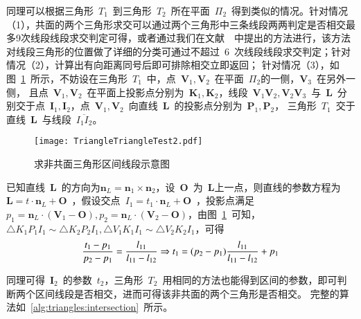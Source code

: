 同理可以根据三角形~$T_1$~到三角形~$T_2$~所在平面~$\Pi_2$~得到类似的情况。针对情况（1），共面的两个三角形求交可以通过两个三角形中三条线段两两判定是否相交最多9次线段线段求交判定可得，或者通过我们在文献~~中提出的方法进行，该方法对线段三角形的位置做了详细的分类可通过不超过~6~次线段线段求交判定；针对情况（2），计算出有向距离同号后即可排除相交立即返回；
针对情况（3），如图~\ref{fig:two:triangle:ui2}~所示，不妨设在三角形~$T_1$~中，点~$\bm{V}_1, \bm{V}_2$~在平面~$\Pi_2$的一侧，$\bm{V}_3$~在另外一侧，
且点~$\bm{V}_1, \bm{V}_2$~在平面上投影点分别为~$\bm{K}_1,\bm{K}_2$，线段~$\bm{V}_1\bm{V}_2, \bm{V}_2\bm{V}_3$~与~$\bm{L}$~分别交于点~$\bm{I}_1,\bm{I}_2$，点~$\bm{V}_1,\bm{V}_2$~向直线~$\bm{L}$~的投影点分别为~$\bm{P}_1,\bm{P}_2$，
三角形~$T_1$~交于直线~$\bm{L}$~与线段~$\overline{I_1I_2}$。%

\begin{figure}[H]
  \centering
    \texttt{[image: TriangleTriangleTest2.pdf]}
    \caption{求非共面三角形区间线段示意图\cite{Moller1997}}
  \label{fig:two:triangle:ui2}
\end{figure}

已知直线~$\bm{L}$~的方向为$\bm{n}_L = \bm{n}_1 \times \bm{n}_2$，设~$\bm{O}$~为~$\bm{L}$上一点，则直线的参数方程为
$\bm{L} = t \cdot \bm{n}_L + \bm{O}$~，假设交点~$I_1 = t_1 \cdot \bm{n}_L + \bm{O}$~，投影点满足
$p_1 = \bm{n}_L \cdot(\bm{V}_1 - \bm{O}), p_2 = \bm{n}_L \cdot (\bm{V}_2 - \bm{O})$，由图~\ref{fig:two:triangle:ui2}~可知，
$\bigtriangleup K_1P_1I_1 \sim \bigtriangleup K_2P_2I_1, \bigtriangleup V_1K_1I_1 \sim \bigtriangleup V_2K_2I_1$，可得
\begin{equation}
  \frac{t_1 - p_1}{p_2-p_1} = \frac{l_{11}}{l_{11}-l_{12}} \Rightarrow \newline
   t_1 = (p_2-p_1)\frac{l_{11}}{l_{11}-l_{12}} + p_1
  \label{equa:triangle:intersectionline:param}
\end{equation}

同理可得~$\bm{I}_2$~的参数~$t_2$，三角形~$T_2$~用相同的方法也能得到区间的参数，即可判断两个区间线段是否相交，进而可得该非共面的两个三角形是否相交。
完整的算法如~\ref{alg:triangles:intersection}~所示。

